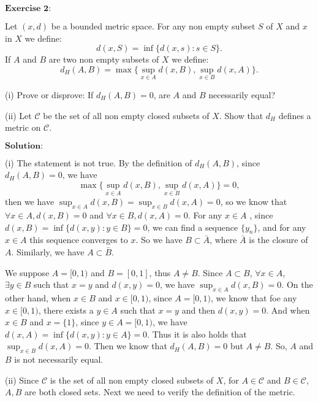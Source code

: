 \documentclass[12pt]{article}
\begin{document}
\newpage


$\textbf{Exercise 2:}$

Let $(x, d)$ be a bounded metric space. For any non empty subset $S$ of $X$ and $x$ in $X$ we define:
\begin{equation*}
   d(x, S) = \inf \{d(x, s): s \in S\}.
\end{equation*}
If $A$ and $B$ are two non empty subsets of $X$ we define:
\begin{equation*}
   d_{H}(A, B) = \max \{\sup_{x \in A} d(x, B), \sup_{x \in B} d(x, A) \}.
\end{equation*}

(i) Prove or disprove: If $d_{H}(A, B) = 0$, are $A$ and $B$ necessarily equal?

(ii) Let $\mathcal{C}$ be the set of all non empty closed subsets of $X$. Show that $d_{H}$ defines a metric on $\mathcal{C}$.
  
\vspace{8pt}
$\textbf{Solution:}$

(i) The statement is not true. By the definition of $d_{H}(A, B)$, since $d_{H}(A, B) = 0$, we have
$$\max \{\sup_{x \in A} d(x, B), \sup_{x \in B} d(x, A) \} = 0,$$
then we have $\sup_{x \in A} d(x, B) =  \sup_{x \in B} d(x, A) = 0$, so we know that $\forall x \in A, d(x, B) = 0$ and $\forall x \in B, d(x, A) = 0$. For any $x \in A$
, since $d(x, B) = \inf \{d(x, y): y \in B \} = 0$, we can find a sequence $\{y_{n}\}$, and for any $x \in A$ this sequence converges to $x$. So we have $B \subset \bar{A}$, where $\bar{A}$ is the closure of $A$. Similarly, we have $A \subset \bar{B}$.

We suppose $A = [0, 1)$ and $B = [0, 1]$, thus $A \neq B$. Since $A \subset B$, $\forall x \in A$, $\exists y \in B$ such that $x = y$ and $d(x, y) = 0$, we have $\sup_{x \in A} d(x, B) = 0$. On the other hand, when $x \in B$ and $x \in [0, 1)$, since $A = [0, 1)$, we know that foe any $x \in [0, 1)$, there exists a $y \in A$ such that $x = y$ and then $d(x, y) = 0$. And when $x \in B$ and $x = \{1\}$, since $y \in A = [0, 1)$, we have $d(x, A) = \inf \{d(x, y): y \in A \} = 0$. Thus it is also holds that $\sup_{x \in B} d(x, A) = 0$. Then we know that $d_{H}(A, B) = 0$ but $A \neq B$. So, $A$ and $B$ is not necessarily equal.

\vspace{8pt}

(ii) Since $\mathcal{C}$ is the set of all non empty closed subsets of $X$, for $A \in \mathcal{C}$ and $B \in \mathcal{C}$, $A, B$ are both closed sets. Next we need to verify the definition of the metric.
\end{document}

